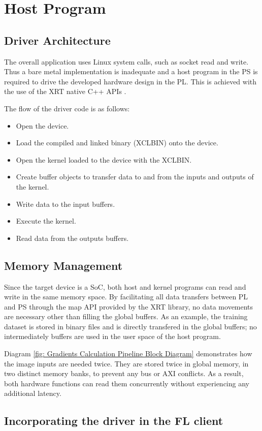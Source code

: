 \section{Host Program}

\subsection{Driver Architecture}
The overall application uses Linux system calls, such as socket read and write. Thus a bare metal implementation is inadequate and a host program in the PS is required to drive the developed hardware design in the PL. This is achieved with the use of the XRT native C++ APIs \cite{XRT_Native_APIs}.

The flow of the driver code is as follows:
\begin{itemize}
    \item Open the device.
    \item Load the compiled and linked binary (XCLBIN) onto the device.
    \item Open the kernel loaded to the device with the XCLBIN.
    \item Create buffer objects to transfer data to and from the inputs and outputs of the kernel.
    \item Write data to the input buffers.
    \item Execute the kernel.
    \item Read data from the outputs buffers.
\end{itemize}

\subsection{Memory Management}
Since the target device is a SoC, both host and kernel programs can read and write in the same memory space. By facilitating all data transfers between PL and PS through the map API provided by the XRT library, no data movements are necessary other than filling the global buffers. As an example, the training dataset is stored in binary files and is directly transfered in the global buffers; no intermediately buffers are used in the user space of the host program.

Diagram \ref{fig: Gradients Calculation Pipeline Block Diagram} demonstrates how the image inputs are needed twice. They are stored twice in global memory, in two distinct memory banks, to prevent any bus or AXI conflicts. As a result, both hardware functions can read them concurrently without experiencing any additional latency.

\subsection{Incorporating the driver in the FL client}
